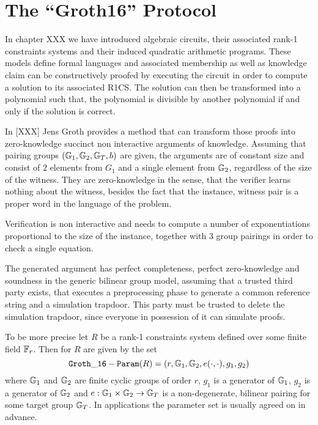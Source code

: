 \section{The ``Groth16'' Protocol} In chapter XXX we have introduced algebraic circuits, their associated rank-1 constraints systems and their induced quadratic arithmetic programs. These models define formal languages and associated membership as well as knowledge claim can be constructively proofed by executing the circuit in order to compute a solution to its associated R1CS. The solution can then be transformed into a polynomial such that,  the polynomial is divisible by another polynomial if and only if the solution is correct. 
 
In [XXX] Jens Groth provides a method that can transform those proofs into zero-knowledge succinct non interactive arguments of knowledge. Assuming that pairing groups $(\mathbb{G}_1,\mathbb{G}_2,\mathbb{G}_T,b)$ are given, the arguments are of constant size and consist of $2$ elements from $G_1$ and a single element from $\mathbb{G}_2$, regardless of the size of the witness. They are zero-knowledge in the sense, that the verifier learns nothing about the witness, besides the fact that the instance, witness pair is a proper word in the language of the problem.

Verification is non interactive and needs to compute a number of exponentiations proportional to the size of the instance, together with $3$ group pairings in order to check a single equation.

The generated argument has perfect completeness, perfect zero-knowledge and soundness in the generic bilinear group model, assuming that a trusted third party exists, that executes a preprocessing phase to generate a common reference string and a simulation trapdoor. This party must be trusted to delete the simulation trapdoor, since everyone in possession of it can simulate proofs. 

To be more precise let $R$ be a rank-1 constraints system defined over some finite field $\mathbb{F}_r$. Then  for $R$ are given by the set
\begin{equation}
\mathtt{Groth\_16-Param}(R)=(r, \mathbb{G}_1, \mathbb{G}_2, e(\cdot,\cdot), g_1,g_2)
\end{equation}
where $\mathbb{G}_1$ and $\mathbb{G}_2$ are finite cyclic groups of order $r$, $g_1$ is a generator of $\mathbb{G}_1$, $g_2$ is a generator of $\mathbb{G}_2$ and $e: \mathbb{G}_1 \times \mathbb{G}_2 \to \mathbb{G}_T$ is a non-degenerate, bilinear pairing for some target group $\mathbb{G}_T$. In applications the parameter set is usually agreed on in advance. 

